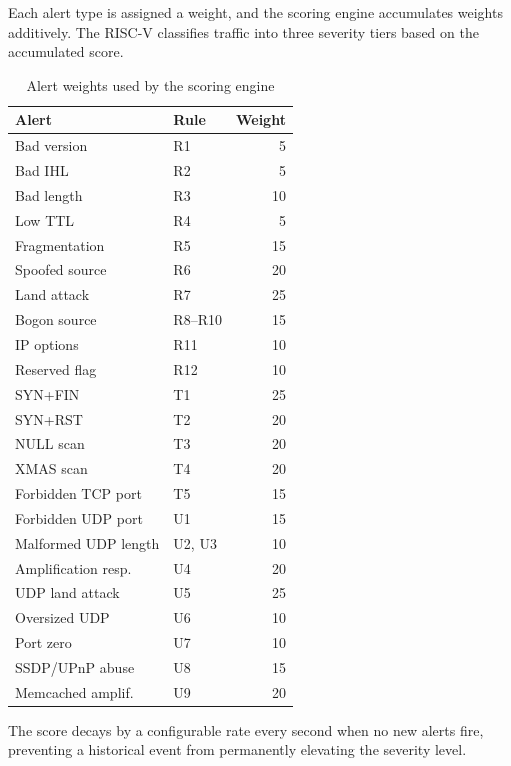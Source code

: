 \documentclass[12pt, a4paper]{report}
\begin{document}
Each alert type is assigned a weight, and the scoring engine accumulates weights additively. The RISC-V classifies traffic into three severity tiers based on the accumulated score.
\begin{table}[H]
\centering
\caption{Alert weights used by the scoring engine}
\label{tab:weights}
\begin{tabular}{llr}
\toprule
\textbf{Alert} & \textbf{Rule} & \textbf{Weight} \\
\midrule
Bad version          & R1       & 5  \\
Bad IHL              & R2       & 5  \\
Bad length           & R3       & 10 \\
Low TTL              & R4       & 5  \\
Fragmentation        & R5       & 15 \\
Spoofed source       & R6       & 20 \\
Land attack          & R7       & 25 \\
Bogon source         & R8--R10  & 15 \\
IP options           & R11      & 10 \\
Reserved flag        & R12      & 10 \\
SYN+FIN              & T1       & 25 \\
SYN+RST              & T2       & 20 \\
NULL scan            & T3       & 20 \\
XMAS scan            & T4       & 20 \\
Forbidden TCP port   & T5       & 15 \\
Forbidden UDP port   & U1       & 15 \\
Malformed UDP length & U2, U3   & 10 \\
Amplification resp.  & U4       & 20 \\
UDP land attack      & U5       & 25 \\
Oversized UDP        & U6       & 10 \\
Port zero            & U7       & 10 \\
SSDP/UPnP abuse      & U8       & 15 \\
Memcached amplif.    & U9       & 20 \\
\bottomrule
\end{tabular}
\end{table}

The score decays by a configurable rate every second when no new alerts fire, preventing a historical event from permanently elevating the severity level.
\end{document}
